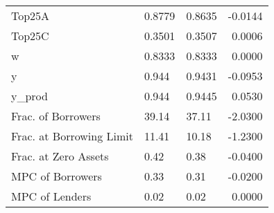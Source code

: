 \begin{table}
\begin{tabular}{lllr}
                  Top25A &  0.8779 &   0.8635 & -0.0144 \\
                  Top25C &  0.3501 &   0.3507 &  0.0006 \\
                       w &  0.8333 &   0.8333 &  0.0000 \\
                       y &   0.944 &   0.9431 & -0.0953 \\
                  y\_prod &   0.944 &   0.9445 &  0.0530 \\
      Frac. of Borrowers &   39.14 &    37.11 & -2.0300 \\
Frac. at Borrowing Limit &   11.41 &    10.18 & -1.2300 \\
    Frac. at Zero Assets &    0.42 &     0.38 & -0.0400 \\
        MPC of Borrowers &    0.33 &     0.31 & -0.0200 \\
          MPC of Lenders &    0.02 &     0.02 &  0.0000 \\
\bottomrule
\end{tabular}
\end{table}
